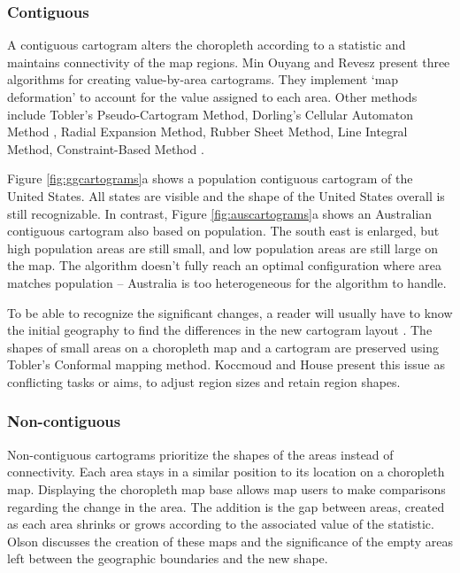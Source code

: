 \documentclass{monashthesis}
\begin{document}
\hypertarget{contiguous}{%
\subsubsection{Contiguous}\label{contiguous}}

A contiguous cartogram alters the choropleth according to a statistic and maintains connectivity of the map regions. Min Ouyang and Revesz \autocite{ACA} present three algorithms for creating value-by-area cartograms. They implement `map deformation' to account for the value assigned to each area. Other methods include Tobler's Pseudo-Cartogram Method, Dorling's Cellular Automaton Method \autocite{ACTUC}, Radial Expansion Method, Rubber Sheet Method, Line Integral Method, Constraint-Based Method \autocite{CBATCC}.

Figure \ref{fig:ggcartograms}a shows a population contiguous cartogram of the United States. All states are visible and the shape of the United States overall is still recognizable. In contrast, Figure \ref{fig:auscartograms}a shows an Australian contiguous cartogram also based on population. The south east is enlarged, but high population areas are still small, and low population areas are still large on the map. The algorithm doesn't fully reach an optimal configuration where area matches population -- Australia is too heterogeneous for the algorithm to handle.

To be able to recognize the significant changes, a reader will usually have to know the initial geography to find the differences in the new cartogram layout \autocite{NAC}. The shapes of small areas on a choropleth map and a cartogram are preserved using Tobler's Conformal mapping method.
Koccmoud and House \autocite{CBATCC} present this issue as conflicting tasks or aims, to adjust region sizes and retain region shapes.

\hypertarget{non-contiguous}{%
\subsubsection{Non-contiguous}\label{non-contiguous}}

Non-contiguous cartograms prioritize the shapes of the areas instead of connectivity. Each area stays in a similar position to its location on a choropleth map. Displaying the choropleth map base allows map users to make comparisons regarding the change in the area. The addition is the gap between areas, created as each area shrinks or grows according to the associated value of the statistic. Olson \autocite{NAC} discusses the creation of these maps and the significance of the empty areas left between the geographic boundaries and the new shape.
\end{document}
